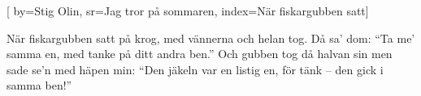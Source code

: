 [ 		
	by={Stig Olin},					
	sr={Jag tror på sommaren},					
	index={När fiskargubben satt}]	
	
\beginverse*						
När fiskargubben satt på krog,
med vännerna och helan tog.
Då sa' dom: ``Ta me' samma en,
med tanke på ditt andra ben.''
Och gubben tog då halvan sin
men sade se'n med häpen min:
``Den jäkeln var en listig en,
för tänk – den gick i samma ben!''
\endverse										
\endsong		
